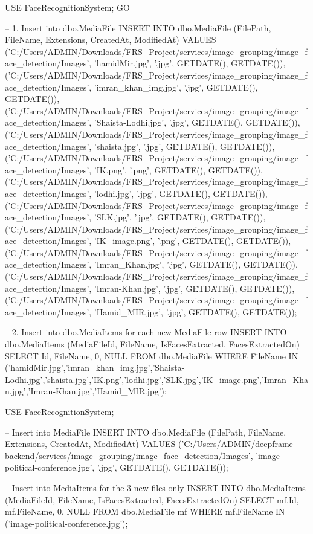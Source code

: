 USE FaceRecognitionSystem;
GO

-- 1. Insert into dbo.MediaFile
INSERT INTO dbo.MediaFile (FilePath, FileName, Extensions, CreatedAt, ModifiedAt)
VALUES
('C:/Users/ADMIN/Downloads/FRS_Project/services/image_grouping/image_face_detection/Images', 'hamidMir.jpg', '.jpg', GETDATE(), GETDATE()),
('C:/Users/ADMIN/Downloads/FRS_Project/services/image_grouping/image_face_detection/Images', 'imran_khan_img.jpg', '.jpg', GETDATE(), GETDATE()),
('C:/Users/ADMIN/Downloads/FRS_Project/services/image_grouping/image_face_detection/Images', 'Shaista-Lodhi.jpg', '.jpg', GETDATE(), GETDATE()),
('C:/Users/ADMIN/Downloads/FRS_Project/services/image_grouping/image_face_detection/Images', 'shaista.jpg', '.jpg', GETDATE(), GETDATE()),
('C:/Users/ADMIN/Downloads/FRS_Project/services/image_grouping/image_face_detection/Images', 'IK.png', '.png', GETDATE(), GETDATE()),
('C:/Users/ADMIN/Downloads/FRS_Project/services/image_grouping/image_face_detection/Images', 'lodhi.jpg', '.jpg', GETDATE(), GETDATE()),
('C:/Users/ADMIN/Downloads/FRS_Project/services/image_grouping/image_face_detection/Images', 'SLK.jpg', '.jpg', GETDATE(), GETDATE()),
('C:/Users/ADMIN/Downloads/FRS_Project/services/image_grouping/image_face_detection/Images', 'IK_image.png', '.png', GETDATE(), GETDATE()),
('C:/Users/ADMIN/Downloads/FRS_Project/services/image_grouping/image_face_detection/Images', 'Imran_Khan.jpg', '.jpg', GETDATE(), GETDATE()),
('C:/Users/ADMIN/Downloads/FRS_Project/services/image_grouping/image_face_detection/Images', 'Imran-Khan.jpg', '.jpg', GETDATE(), GETDATE()),
('C:/Users/ADMIN/Downloads/FRS_Project/services/image_grouping/image_face_detection/Images', 'Hamid_MIR.jpg', '.jpg', GETDATE(), GETDATE());

-- 2. Insert into dbo.MediaItems for each new MediaFile row
INSERT INTO dbo.MediaItems (MediaFileId, FileName, IsFacesExtracted, FacesExtractedOn)
SELECT Id, FileName, 0, NULL
FROM dbo.MediaFile
WHERE FileName IN ('hamidMir.jpg','imran_khan_img.jpg','Shaista-Lodhi.jpg','shaista.jpg','IK.png','lodhi.jpg','SLK.jpg','IK_image.png','Imran_Khan.jpg','Imran-Khan.jpg','Hamid_MIR.jpg');

USE FaceRecognitionSystem;

-- Insert into MediaFile
INSERT INTO dbo.MediaFile (FilePath, FileName, Extensions, CreatedAt, ModifiedAt)
VALUES
('C:/Users/ADMIN/deepframe-backend/services/image_grouping/image_face_detection/Images', 'image-political-conference.jpg', '.jpg', GETDATE(), GETDATE());

-- Insert into MediaItems for the 3 new files only
INSERT INTO dbo.MediaItems (MediaFileId, FileName, IsFacesExtracted, FacesExtractedOn)
SELECT mf.Id, mf.FileName, 0, NULL
FROM dbo.MediaFile mf
WHERE mf.FileName IN ('image-political-conference.jpg');


